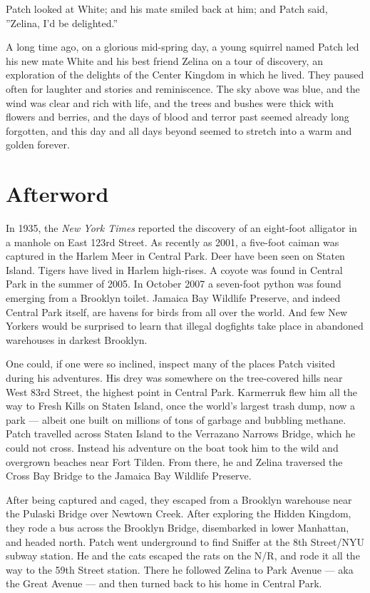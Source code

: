 \documentclass[12pt]{book}
\begin{document}
Patch looked at White; and his mate smiled back at him; and Patch
said, ''Zelina, I'd be delighted.''

A long time ago, on a glorious mid-spring day, a young squirrel named
Patch led his new mate White and his best friend Zelina on a tour of
discovery, an exploration of the delights of the Center Kingdom in
which he lived. They paused often for laughter and stories and
reminiscence. The sky above was blue, and the wind was clear and rich
with life, and the trees and bushes were thick with flowers and
berries, and the days of blood and terror past seemed already long
forgotten, and this day and all days beyond seemed to stretch into a
warm and golden forever.


\section{Afterword}

In 1935, the \textit{New York Times} reported the discovery of an
eight-foot alligator in a manhole on East 123rd Street. As recently as
2001, a five-foot caiman was captured in the Harlem Meer in Central
Park. Deer have been seen on Staten Island. Tigers have lived in
Harlem high-rises. A coyote was found in Central Park in the summer of
2005. In October 2007 a seven-foot python was found emerging from a
Brooklyn toilet. Jamaica Bay Wildlife Preserve, and indeed Central
Park itself, are havens for birds from all over the world. And few New
Yorkers would be surprised to learn that illegal dogfights take place
in abandoned warehouses in darkest Brooklyn.

One could, if one were so inclined, inspect many of the places Patch
visited during his adventures. His drey was somewhere on the
tree-covered hills near West 83rd Street, the highest point in Central
Park. Karmerruk flew him all the way to Fresh Kills on Staten Island,
once the world's largest trash dump, now a park --- albeit one built
on millions of tons of garbage and bubbling methane. Patch travelled
across Staten Island to the Verrazano Narrows Bridge, which he could
not cross. Instead his adventure on the boat took him to the wild and
overgrown beaches near Fort Tilden. From there, he and Zelina
traversed the Cross Bay Bridge to the Jamaica Bay Wildlife Preserve.

After being captured and caged, they escaped from a Brooklyn warehouse
near the Pulaski Bridge over Newtown Creek. After exploring the Hidden
Kingdom, they rode a bus across the Brooklyn Bridge, disembarked in
lower Manhattan, and headed north. Patch went underground to find
Sniffer at the 8th Street/NYU subway station. He and the cats escaped
the rats on the N/R, and rode it all the way to the 59th Street
station. There he followed Zelina to Park Avenue --- aka the Great
Avenue --- and then turned back to his home in Central Park.
\end{document}
